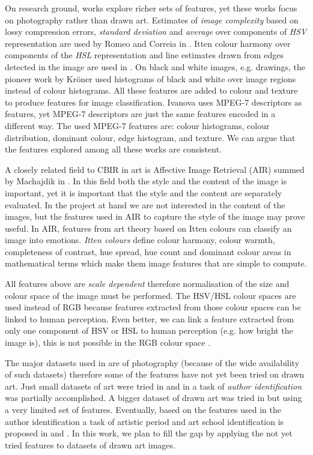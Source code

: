 \documentclass[a4paper,twocolumn]{article}
\begin{document}
On research ground, works explore richer sets of features, yet these works
focus on photography rather than drawn art.  Estimates of \emph{image
complexity} based on lossy compression errors, \emph{standard deviation} and
\emph{average} over components of \emph{HSV} representation are used by Romeo
and Correia in \cite{jma12clas,cmrc13fs,rmc12ajs}.  Itten colour harmony over
components of the \emph{HSL} representation and line estimates drawn from edges
detected in the image are used in \cite{mach10clas}.  On black and white
images, e.g.  drawings, the pioneer work by Kr\"oner \cite{kroner98draw} used
histograms of black and white over image regions instead of colour histograms.
All these features are added to colour and texture to produce features for
image classification.  Ivanova \cite{isv12mpeg} uses MPEG-7 descriptors as
features, yet MPEG-7 descriptors are just the same features encoded in a
different way.  The used MPEG-7 features are: colour histograms, colour
distribution, dominant colour, edge histogram, and texture.  We can argue that
the features explored among all these works are consistent.

A closely related field to CBIR in art is Affective Image Retrieval (AIR)
summed by Machajdik in \cite{mach10ua,mach10clas}.  In this field both the
style and the content of the image is important, yet it is important that the
style and the content are separately evaluated.  In the project at hand we are
not interested in the content of the images, but the features used in AIR to
capture the style of the image may prove useful.  In AIR, features from art
theory based on Itten colours can classify an image into emotions.  \emph{Itten
colours} define colour harmony, colour warmth, completeness of contrast, hue
spread, hue count and dominant colour areas in mathematical terms which make
them image features that are simple to compute.

All features above are \emph{scale dependent} \cite{rmc12ajs,mach10clas}
therefore normalisation of the size and colour space of the image must be
performed.  The HSV/HSL colour spaces are used instead of RGB because features
extracted from those colour spaces can be linked to human perception.  Even
better, we can link a feature extracted from only one component of HSV or HSL
to human perception (e.g. how bright the image is), this is not possible in the
RGB colour space \cite{rmc12ajs}.

The major datasets used in \cite{rmc12ajs,mach10clas} are of photography
(because of the wide availability of such datasets) therefore some of the
features have not yet been tried on drawn art.  Just small datasets of art were
tried in \cite{mach10clas} and in \cite{rmc12ajs} a task of \emph{author
identification} was partially accomplished.  A bigger dataset of drawn art was
tried in \cite{zirnhelt07art} but using a very limited set of features.
Eventually, based on the features used in the author identification a task of
artistic period and art school identification is proposed in
\cite{zirnhelt07art} and \cite{rmc12ajs}.  In this work, we plan to fill the
gap by applying the not yet tried features to datasets of drawn art images.
\end{document}
